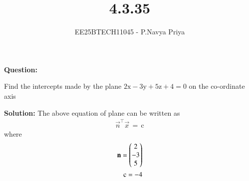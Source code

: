 \documentclass[journal,12pt,onecolumn]{IEEEtran}
\theoremstyle{remark}
\begin{document}
\title{4.3.35}
\author{EE25BTECH11045 - P.Navya Priya}
\maketitle
\renewcommand{\thefigure}{\theenumi}
\renewcommand{\thetable}{\theenumi}
\textbf{Question:}

 Find the intercepts made by the plane $2\text{x} - 3\text{y} + 5\text{z} + 4 = 0$ on the co-ordinate axis 

\textbf{Solution:}
The above equation of plane can be written as
\begin{align*}
    \vec{n}^\top \vec{x}\,=\,\text{c}
\end{align*}
where 
\begin{align}
    \mathbf{n}=\begin{pmatrix}2\\-3\\5\end{pmatrix}\\
    \text{c}=-4
\end{align}
\end{document}
